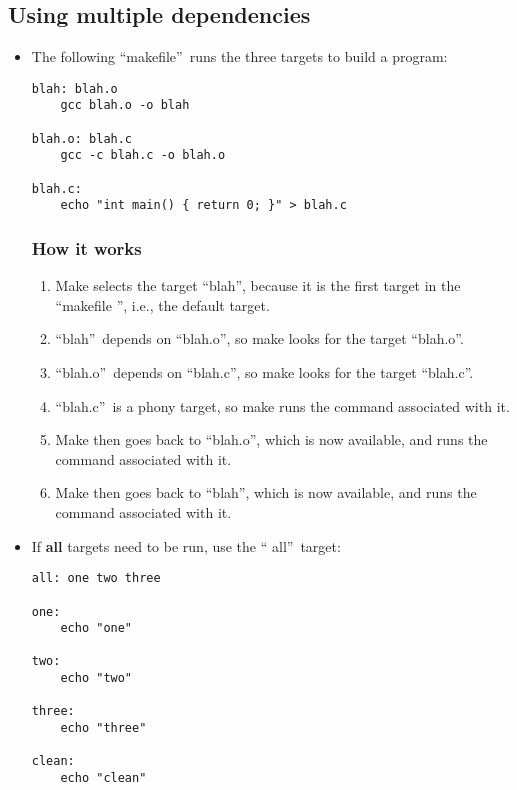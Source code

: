 \subsection{Using multiple dependencies}
\begin{itemize}
    \item The following \textquotedblleft makefile\textquotedblright\ runs the
    three targets to build a program:
    \begin{verbatim}
blah: blah.o
    gcc blah.o -o blah

blah.o: blah.c
    gcc -c blah.c -o blah.o

blah.c:
    echo "int main() { return 0; }" > blah.c
    \end{verbatim}
    \subsubsection{How it works}
    \begin{enumerate}
        \item Make selects the target \textquotedblleft blah\textquotedblright,
        because it is the first target in the \textquotedblleft makefile
        \textquotedblright, i.e., the default target.
        \item \textquotedblleft blah\textquotedblright\ depends on 
        \textquotedblleft blah.o\textquotedblright, so make looks for the
        target \textquotedblleft blah.o\textquotedblright.
        \item \textquotedblleft blah.o\textquotedblright\ depends on
        \textquotedblleft blah.c\textquotedblright, so make looks for the
        target \textquotedblleft blah.c\textquotedblright.
        \item \textquotedblleft blah.c\textquotedblright\ is a phony target,
        so make runs the command associated with it.
        \item Make then goes back to \textquotedblleft blah.o\textquotedblright,
        which is now available, and runs the command associated with it.
        \item Make then goes back to \textquotedblleft blah\textquotedblright,
        which is now available, and runs the command associated with it.
    \end{enumerate}
    \item If \textbf{all} targets need to be run, use the \textquotedblleft
    all\textquotedblright\ target:
    \begin{verbatim}
all: one two three

one:
    echo "one"

two:
    echo "two"

three:
    echo "three"

clean:
    echo "clean"
    \end{verbatim}
\end{itemize}

